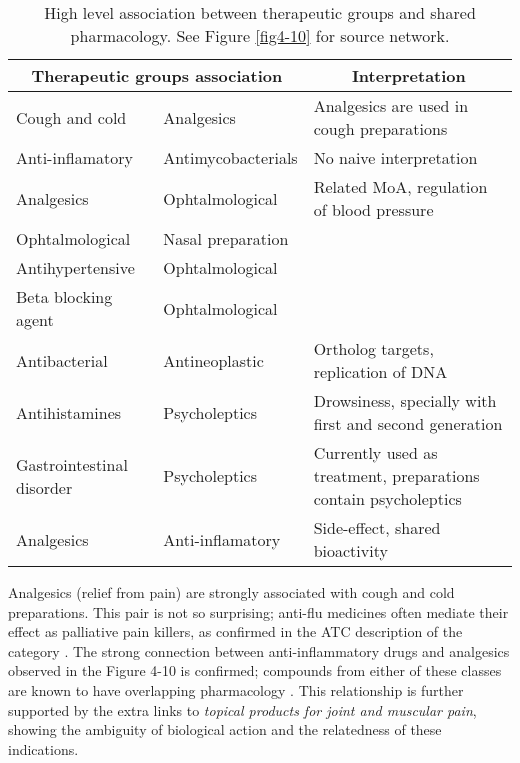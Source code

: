 \begin{table}[htbp]
\scriptsize
\begin{tabular}{|l|l|p{5cm}|}
\hline
\multicolumn{2}{|c|}{\textbf{Therapeutic groups association}} & \multicolumn{1}{c|}{\textbf{Interpretation}} \\ \hline
Cough and cold & Analgesics & Analgesics are used in cough preparations \citep{atcr05} \\ \hline
Anti-inflamatory & Antimycobacterials & No naive interpretation \\ \hline
Analgesics & Ophtalmological & \multicolumn{ 1}{l|}{Related MoA, regulation of blood pressure} \\ \cline{ 1- 2}
Ophtalmological & Nasal preparation & \multicolumn{ 1}{l|}{} \\ \cline{ 1- 2}
Antihypertensive & Ophtalmological & \multicolumn{ 1}{l|}{} \\ \cline{ 1- 2}
Beta blocking agent & Ophtalmological & \multicolumn{ 1}{l|}{} \\ \hline
Antibacterial & Antineoplastic & Ortholog targets, replication of DNA \\ \hline
Antihistamines & Psycholeptics & Drowsiness, specially with first and second generation \citep{gengo1987antihistamines} \\ \hline
Gastrointestinal disorder & Psycholeptics & Currently used as treatment, preparations contain psycholeptics \citep{atca03} \\ \hline
Analgesics & Anti-inflamatory & Side-effect, shared bioactivity \citep{hunskaar1987formalin} \\ \hline
\end{tabular}
\caption{High level association between therapeutic groups and shared pharmacology. See Figure \ref{fig4-10} for source network.}
\label{higlevelhypo}
\end{table}

Analgesics (relief from pain) are strongly associated with cough and cold preparations. This pair is not so surprising; anti-flu medicines often mediate their effect as palliative pain killers, as confirmed in the ATC description of the category \citep{atcr05}. The strong connection between anti-inflammatory drugs and analgesics observed in the Figure 4-10 is confirmed; compounds from either of these classes are known to have overlapping pharmacology \citep{hunskaar1987formalin}. This relationship is further supported by the extra links to \emph{topical products for joint and muscular pain}, showing the ambiguity of biological action and the relatedness of these indications.

